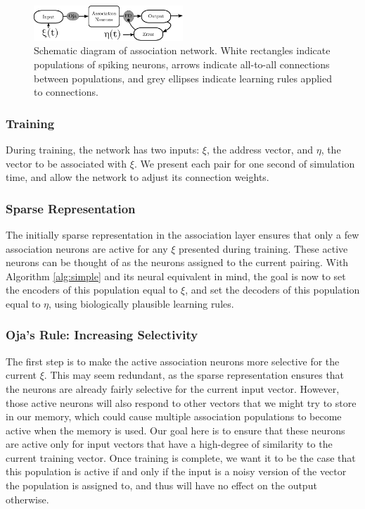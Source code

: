 \documentclass[10pt,letterpaper]{article}
\begin{document}
\begin{figure}[t]
\begin{center}
\includegraphics[width=0.5\textwidth]{../diagrams/schematic.pdf}
\end{center}
\caption{Schematic diagram of association network. White rectangles indicate populations of spiking neurons, arrows indicate all-to-all connections between populations, and grey ellipses indicate learning rules applied to connections.}
\label{fig:schematic}
\end{figure}
\subsubsection{Training}
During training, the network has two inputs: $\xi$, the address vector, and $\eta$, the vector to be associated with $\xi$. We present each pair for one second of simulation time, and allow the network to adjust its connection weights.

\subsubsection{Sparse Representation}
The initially sparse representation in the association layer ensures that only a few association neurons are active for any $\xi$ presented during training. These active neurons can be thought of as the neurons assigned to the current pairing. With Algorithm \ref{alg:simple} and its neural equivalent in mind, the goal is now to set the encoders of this population equal to $\xi$, and set the decoders of this population equal to $\eta$, using biologically plausible learning rules. 

\subsubsection{Oja's Rule: Increasing Selectivity}
The first step is to make the active association neurons more selective for the current $\xi$. This may seem redundant, as the sparse representation ensures that the neurons are already fairly selective for the current input vector. However, those active neurons will also respond to other vectors that we might try to store in our memory, which could cause multiple association populations to become active when the memory is used. Our goal here is to ensure that these neurons are active only for input vectors that have a high-degree of similarity to the current training vector. Once training is complete, we want it to be the case that this population is active if and only if the input is a noisy version of the vector the population is assigned to, and thus will have no effect on the output otherwise.
\end{document}
